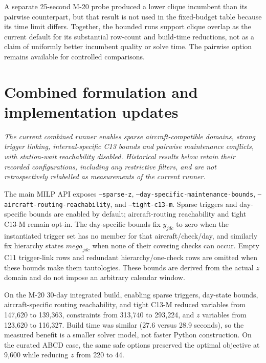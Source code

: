 A separate 25-second M-20 probe produced a lower clique incumbent than its
pairwise counterpart, but that result is not used in the fixed-budget table
because its time limit differs. Together, the bounded runs support clique
overlap as the current default for its substantial row-count and build-time
reductions, not as a claim of uniformly better incumbent quality or solve time.
The pairwise option remains available for controlled comparisons.



\section{Combined formulation and implementation updates}

\textit{The current combined runner enables sparse aircraft-compatible domains,
strong trigger linking, interval-specific C13 bounds and pairwise maintenance
conflicts, with station-wait reachability disabled. Historical results below
retain their recorded configurations, including any restrictive filters, and
are not retrospectively relabelled as measurements of the current runner.}

The main MILP API exposes \texttt{--sparse-z},
\texttt{--day-specific-maintenance-bounds},
\texttt{--aircraft-routing-reachability}, and \texttt{--tight-c13-m}. Sparse
triggers and day-specific bounds are enabled by default; aircraft-routing
reachability and tight C13-M remain opt-in. The day-specific bounds fix
$y_{jdc}$ to zero when the instantiated trigger set has
no member for that aircraft/check/day, and similarly fix hierarchy states
$\mathit{mega}_{jdc}$ when none of their covering checks can occur. Empty C11
trigger-link rows and redundant hierarchy/one-check rows are omitted when these
bounds make them tautologies. These bounds are derived from the actual $z$
domain and do not impose an arbitrary calendar window.

On the M-20 30-day integrated build, enabling sparse triggers, day-state bounds,
aircraft-specific routing reachability, and tight C13-M reduced variables from
147{,}620 to 139{,}363, constraints from 313{,}740 to 293{,}224, and $z$
variables from 123{,}620 to 116{,}327. Build time was similar (27.6 versus
28.9 seconds), so the measured benefit is a smaller solver model, not faster
Python construction. On the curated ABCD case, the same safe options preserved
the optimal objective at 9{,}600 while reducing $z$ from 220 to 44.

